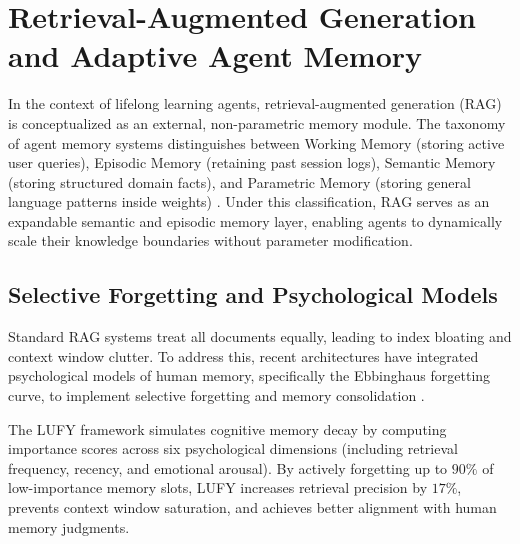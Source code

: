 \section{Retrieval-Augmented Generation and Adaptive Agent Memory}

In the context of lifelong learning agents, retrieval-augmented generation (RAG) is conceptualized as an external, non-parametric memory module. The taxonomy of agent memory systems distinguishes between Working Memory (storing active user queries), Episodic Memory (retaining past session logs), Semantic Memory (storing structured domain facts), and Parametric Memory (storing general language patterns inside weights) \parencite{11328884}. Under this classification, RAG serves as an expandable semantic and episodic memory layer, enabling agents to dynamically scale their knowledge boundaries without parameter modification.

\subsection{Selective Forgetting and Psychological Models}
Standard RAG systems treat all documents equally, leading to index bloating and context window clutter. To address this, recent architectures have integrated psychological models of human memory, specifically the Ebbinghaus forgetting curve, to implement selective forgetting and memory consolidation \parencite{Sumida_2025}. 

The LUFY framework \parencite{Sumida_2025} simulates cognitive memory decay by computing importance scores across six psychological dimensions (including retrieval frequency, recency, and emotional arousal). By actively forgetting up to $90\%$ of low-importance memory slots, LUFY increases retrieval precision by $17\%$, prevents context window saturation, and achieves better alignment with human memory judgments.

